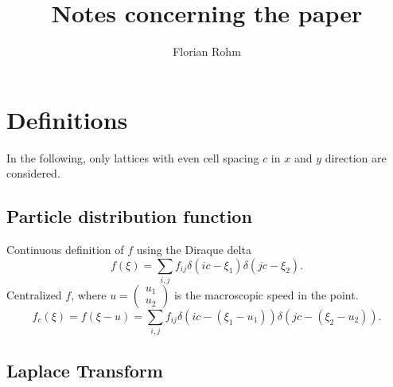\documentclass{article}
\title{Notes concerning the paper}
\author{Florian Rohm}
\begin{document}
\maketitle
\tableofcontents
\newpage
\listoftodos{}
\newpage


\section{Definitions}
\label{sec:Definitions}
In the following, only lattices with even cell spacing $c$ in $x$ and $y$ direction are considered.

\subsection{Particle distribution function}
\label{sub:Particle distribution function}

Continuous definition of $f$ using the Diraque delta
\begin{equation}
  \label{eq:Definition of f xi}
  f(\xi) = \sum_{i,j} f_{ij}\delta(ic - \xi_1)\delta(jc - \xi_2).
\end{equation}
Centralized $f$, where $u=\begin{pmatrix}u_1 \\ u_2\end{pmatrix}$ is the macroscopic speed in the point.
\begin{equation}
  \label{eq:Definition of f_c xi}
  f_c(\xi) = f(\xi-u) = \sum_{i,j} f_{ij}\delta(ic - (\xi_1-u_1))\delta(jc - (\xi_2-u_2)).
\end{equation}

\subsection{Laplace Transform}
\label{sub:Laplace Transform}
\end{document}
